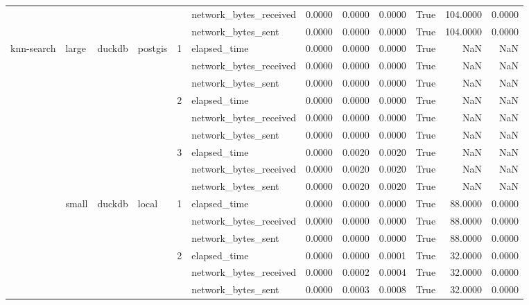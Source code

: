 \begin{tabular}{llllllrrrrrr}
 &  &  &  &  & network_bytes_received & 0.0000 & 0.0000 & 0.0000 & True & 104.0000 & 0.0000 \\
 &  &  &  &  & network_bytes_sent & 0.0000 & 0.0000 & 0.0000 & True & 104.0000 & 0.0000 \\
\cline{1-12} \cline{2-12} \cline{3-12} \cline{4-12} \cline{5-12}
\multirow[t]{36}{*}{knn-search} & \multirow[t]{9}{*}{large} & \multirow[t]{9}{*}{duckdb} & \multirow[t]{9}{*}{postgis} & \multirow[t]{3}{*}{1} & elapsed_time & 0.0000 & 0.0000 & 0.0000 & True & NaN & NaN \\
 &  &  &  &  & network_bytes_received & 0.0000 & 0.0000 & 0.0000 & True & NaN & NaN \\
 &  &  &  &  & network_bytes_sent & 0.0000 & 0.0000 & 0.0000 & True & NaN & NaN \\
\cline{5-12}
 &  &  &  & \multirow[t]{3}{*}{2} & elapsed_time & 0.0000 & 0.0000 & 0.0000 & True & NaN & NaN \\
 &  &  &  &  & network_bytes_received & 0.0000 & 0.0000 & 0.0000 & True & NaN & NaN \\
 &  &  &  &  & network_bytes_sent & 0.0000 & 0.0000 & 0.0000 & True & NaN & NaN \\
\cline{5-12}
 &  &  &  & \multirow[t]{3}{*}{3} & elapsed_time & 0.0000 & 0.0020 & 0.0020 & True & NaN & NaN \\
 &  &  &  &  & network_bytes_received & 0.0000 & 0.0020 & 0.0020 & True & NaN & NaN \\
 &  &  &  &  & network_bytes_sent & 0.0000 & 0.0020 & 0.0020 & True & NaN & NaN \\
\cline{2-12} \cline{3-12} \cline{4-12} \cline{5-12}
 & \multirow[t]{27}{*}{small} & \multirow[t]{18}{*}{duckdb} & \multirow[t]{9}{*}{local} & \multirow[t]{3}{*}{1} & elapsed_time & 0.0000 & 0.0000 & 0.0000 & True & 88.0000 & 0.0000 \\
 &  &  &  &  & network_bytes_received & 0.0000 & 0.0000 & 0.0000 & True & 88.0000 & 0.0000 \\
 &  &  &  &  & network_bytes_sent & 0.0000 & 0.0000 & 0.0000 & True & 88.0000 & 0.0000 \\
\cline{5-12}
 &  &  &  & \multirow[t]{3}{*}{2} & elapsed_time & 0.0000 & 0.0000 & 0.0001 & True & 32.0000 & 0.0000 \\
 &  &  &  &  & network_bytes_received & 0.0000 & 0.0002 & 0.0004 & True & 32.0000 & 0.0000 \\
 &  &  &  &  & network_bytes_sent & 0.0000 & 0.0003 & 0.0008 & True & 32.0000 & 0.0000 \\
\cline{5-12}

\end{tabular}
